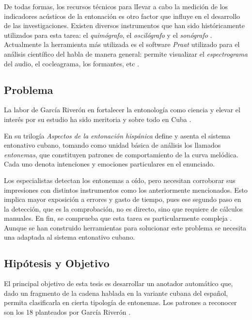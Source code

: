 De todas formas, los recursos técnicos para lIevar a cabo la medición de los indicadores acústicos de la entonación es otro factor que influye en el desarrollo de las investigaciones. Existen diversos instrumentos que han sido históricamente utilizados para esta tarea: el \emph{quimógrafo}, el \emph{oscilógrafo} y el \emph{sonógrafo} \cite{garcia1996aspectos2}. Actualmente la herramienta m\'as utilizada es el software \emph{Praat} \cite{goldman2011easyalign} utilizado para el an\'alisis cient\'ifico del habla de manera general: permite visualizar el \emph{espectrograma} del audio, el cocleagrama, los formantes, etc \cite{ruiz2014entonacion}. 


\subsection*{Problema}

La labor de Garc\'ia River\'on en fortalecer la entonolog\'ia como ciencia y elevar el inter\'es por su estudio ha sido meritoria y sobre todo en Cuba \cite{garcia2004entonacion, garcia2005estudio, riveronuniv, riveronguanta, cubadice, nottelecubana, raquel2018interrogativa, riveroncomplejo}.


En su trilog\'ia \emph{Aspectos de la entonaci\'on hisp\'anica} \cite{garcia1996aspectos1, garcia1996aspectos2, garcia1998aspectos} define y asenta el sistema entonativo cubano, tomando como unidad b\'asica de an\'alisis los llamados \emph{entonemas}, que constituyen patrones de comportamiento de la curva melódica. Cada uno denota intenciones y emociones particulares en el enunciado.


Los especialistas detectan los entonemas a oído, pero necesitan corroborar sus impresiones con distintos instrumentos como los anteriormente mencionados. Esto implica mayor exposición a errores y gasto de tiempo, pues ese segundo paso en la detección, que es la comprobación, no es directo, sino que requiere de cálculos manuales. En fin, se comprueba que esta tarea es particularmente compleja \cite{silverman1992tobi}. Aunque se han construido herramientas para solucionar este problema se necesita una adaptada al sistema entonativo cubano.



\subsection*{Hip\'otesis y Objetivo}
El principal objetivo de esta tesis es desarrollar un anotador autom\'atico que, dado un fragmento de la cadena hablada en la variante cubana del espa\~nol, permita clasificarla en cierta tipolog\'ia de entonemas. Los patrones a reconocer son los 18 planteados por Garc\'ia River\'on \cite[c\'ap. III]{garcia1996aspectos1}.


